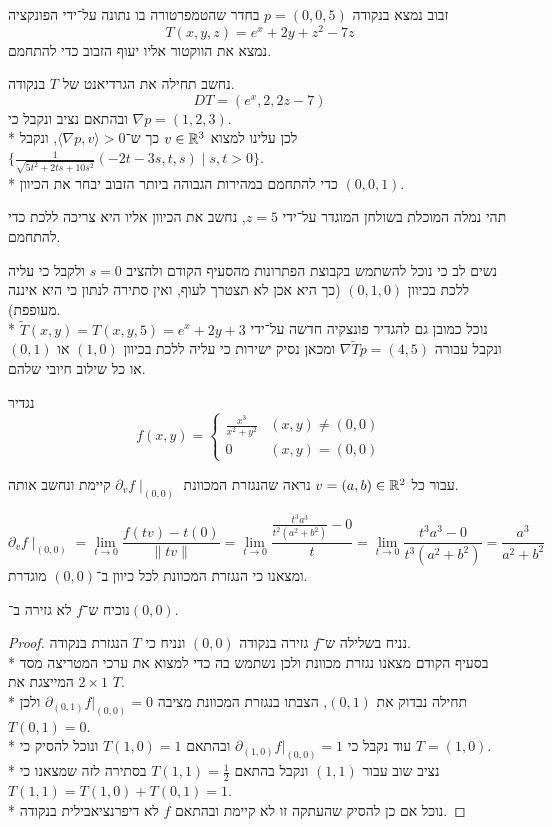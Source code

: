 \Question{}
\Subquestion{}
זבוב נמצא בנקודה $p = (0, 0, 5)$ בחדר שהטמפרטורה בו נתונה על־ידי הפונקציה
\[
	T(x, y, z) = e^x + 2y + z^2 - 7z
\]
נמצא את הווקטור אליו יעוף הזבוב כדי להתחמם.

נחשב תחילה את הגרדיאנט של $T$ בנקודה.
\[
	DT = (e^x, 2, 2z - 7)
\]
ובהתאם נציב ונקבל כי $\nabla p = (1, 2, 3)$. \\*
לכן עלינו למצוא $v \in \mathbb{R}^3$ כך ש־$\langle \nabla p, v \rangle > 0$, ונקבל $\{ \frac{1}{\sqrt{5t^2 + 2ts + 10s^2}}(-2t - 3s, t, s) \mid s, t > 0 \}$. \\*
כדי להתחמם במהירות הגבוהה ביותר הזבוב יבחר את הכיוון $(0, 0, 1)$.

\Subquestion{}
תהי נמלה המוכלת בשולחן המוגדר על־ידי $z = 5$, נחשב את הכיוון אליו היא צריכה ללכת כדי להתחמם.

נשים לב כי נוכל להשתמש בקבוצת הפתרונות מהסעיף הקודם ולהציב $s = 0$ ולקבל כי עליה ללכת בכיוון $(0, 1, 0)$ (כך היא אכן לא תצטרך לעוף, ואין סתירה לנתון כי היא איננה מעופפת). \\*
נוכל כמובן גם להגדיר פונצקיה חדשה על־ידי $\tilde{T}(x, y) = T(x, y, 5) = e^x + 2y + 3$ ונקבל עבורה $\nabla \tilde{T} p = (4, 5)$ ומכאן נסיק ישירות כי עליה ללכת בכיוון $(1, 0)$ או $(0, 1)$ או כל שילוב חיובי שלהם.

\Question{}
נגדיר
\[
	f(x, y) = \begin{cases}
		\frac{x^3}{x^2 + y^2} & (x, y) \ne (0, 0) \\
		0 & (x, y) = (0, 0)
	\end{cases}
\]

\Subquestion{}
עבור כל $v = (a, b) \in \mathbb{R}^2$ נראה שהנגזרת המכוונת $\partial_v f \mid_{(0, 0)}$ קיימת ונחשב אותה.

\[
	\partial_v f \mid_{(0, 0)}
	= \lim_{t \to 0} \frac{f(t v) - t(0)}{\lVert t v \rVert}
	= \lim_{t \to 0} \frac{\frac{t^3 a^3}{t^2 (a^2 + b^2)} - 0}{t}
	= \lim_{t \to 0} \frac{t^3 a^3 - 0}{t^3 (a^2 + b^2)}
	= \frac{a^3}{a^2 + b^2}
\]
ומצאנו כי הנגזרת המכוונת לכל כיוון ב־$(0, 0)$ מוגדרת.

\Subquestion{}
נוכיח ש־$f$ לא גזירה ב־$(0, 0)$.
\begin{proof}
	נניח בשלילה ש־$f$ גזירה בנקודה $(0, 0)$ ונניח כי $T$ הנגזרת בנקודה. \\*
	בסעיף הקודם מצאנו נגזרת מכוונת ולכן נשתמש בה כדי למצוא את ערכי המטריצה מסד$2 \times 1$ המייצגת את $T$. \\*
	תחילה נבדוק את $(0, 1)$, הצבתו בנגזרת המכוונת מציבה $\partial_{(0, 1)} f |_{(0, 0)} = 0$ ולכן $T(0, 1) = 0$. \\*
	עוד נקבל כי $\partial_{(1, 0)} f |_{(0, 0)} = 1$ ובהתאם $T(1, 0) = 1$ ונוכל להסיק כי $T = (1, 0)$. \\*
	נציב שוב עבור $(1, 1)$ ונקבל בהתאם $T(1, 1) = \frac{1}{2}$ בסתירה לזה שמצאנו כי $T(1, 1) = T(1, 0) + T(0, 1) = 1$. \\*
	נוכל אם כן להסיק שהעתקה זו לא קיימת ובהתאם $f$ לא דיפרנציאבילית בנקודה.
\end{proof}


